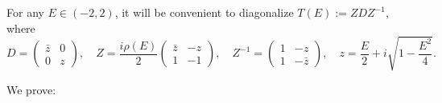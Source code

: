\documentclass[12pt, reqno]{amsart}
\theoremstyle{definition}
\theoremstyle{remark}
\numberwithin{equation}{section}
\begin{document}
For any $E\in(-2,2)$, it will be convenient to diagonalize $T(E):=ZDZ^{-1}$, where
\begin{equation} \label{Ediagonalized}
    D=\begin{pmatrix}
        \bar{z}&0\\0&z
    \end{pmatrix},\quad Z=\frac{i\rho(E)}{2}\begin{pmatrix}\bar{z}&-z\\1&-1\end{pmatrix},\quad Z^{-1}=\begin{pmatrix}1&-z\\1&-\bar{z}\end{pmatrix},\quad z=\frac{E}{2}+i\sqrt{1-\frac{E^2}{4}}.
\end{equation}


We prove:
\end{document}

